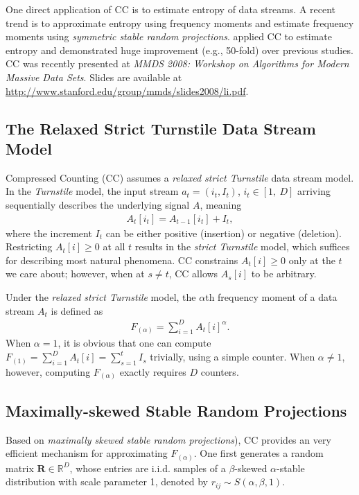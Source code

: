 \documentclass[oneside,10pt]{article}
\begin{document}
One direct application of CC is to estimate entropy of data streams. A recent trend is to approximate entropy using frequency moments and estimate frequency moments using {\em symmetric stable random projections}\cite{Proc:Zhao_IMC07,Proc:Harvey_FOCS08}.  \cite{Report:Li_CC_entropy} applied CC to estimate entropy and demonstrated huge improvement (e.g., 50-fold) over previous studies.\\



CC was recently presented at {\em  MMDS 2008: Workshop on Algorithms for Modern Massive Data Sets}. Slides are available at \url{http://www.stanford.edu/group/mmds/slides2008/li.pdf}.


\subsection{The Relaxed Strict Turnstile Data Stream Model }

Compressed Counting (CC) assumes a {\em relaxed strict Turnstile} data stream model. In the {\em Turnstile} model\cite{Article:Muthukrishnan_05}, the input  stream $a_t = (i_t, I_t)$, $i_t\in [1,\ D]$ arriving sequentially describes the underlying signal $A$, meaning
\begin{align}
A_t[i_t] = A_{t-1}[i_t] + I_t,
\end{align} where the increment $I_t$ can be either positive (insertion) or negative (deletion). Restricting  $A_t[i]\geq 0$ at all  $t$  results in the {\em strict Turnstile} model, which suffices for describing most natural phenomena. CC constrains $A_t[i]\geq 0$ only at the $t$ we care about; however, when at $s \neq t$, CC allows $A_s[i]$ to be arbitrary.

Under the {\em relaxed strict Turnstile} model, the $\alpha$th frequency moment of a data stream $A_t$ is defined as
\begin{align}
F_{(\alpha)} = \sum_{i=1}^DA_t[i]^\alpha.
 \end{align}
When $\alpha = 1$, it is obvious that one can compute $F_{(1)} = \sum_{i=1}^D A_t[i] = \sum_{s=1}^t I_s$ trivially, using a simple counter.  When $\alpha \neq 1$, however, computing $F_{(\alpha)}$ exactly requires $D$ counters.

\subsection{Maximally-skewed Stable Random Projections}

Based on {\em maximally skewed stable random projections}), CC provides an very efficient mechanism for approximating $F_{(\alpha)}$.  One first generates a random matrix $\mathbf{R}\in\mathbb{R}^{D}$, whose entries are i.i.d. samples of a $\beta$-skewed $\alpha$-stable distribution with scale parameter 1, denoted by $r_{ij}\sim S(\alpha, \beta, 1)$.
\end{document}
